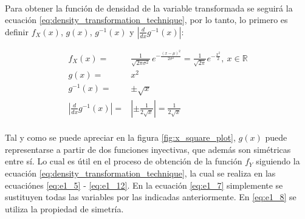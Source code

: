\documentclass{article}
\begin{document}
    \paragraph{}
    Para obtener la función de densidad de la variable transformada se seguirá la ecuación \eqref{eq:density_transformation_technique}, por lo tanto, lo primero es definir $f_X(x)$, $g(x)$, $g^{-1}(x)$ y $\left| \frac{d}{dx} g^{-1} (x) \right|$:

    \begin{align}
    \label{eq:e1_1}
      f_X(x) =& {\displaystyle {\frac {1}{\sqrt {2\pi \sigma ^{2}}}}\,e^{-{\frac {(x-\mu )^{2}}{2\sigma ^{2}}}}} = \frac{1}{\sqrt{2\pi} } e^{-\frac{x^2}{2}}, \ x \in \mathbb{R} \\
    \label{eq:e1_2}
      g(x) =& x^2 \\
    \label{eq:e1_3}
      g^{-1}(x) =& \pm \sqrt{x} \\
    \label{eq:e1_4}
      \left| \frac{d}{dx} g^{-1} (x) \right| =& \left| \pm \frac{1}{2\sqrt{x}}  \right| = \frac{1}{2\sqrt{x}}
    \end{align}

    \paragraph{}
    Tal y como se puede apreciar en la figura \ref{fig:x_square_plot}, $g(x)$ puede representarse a partir de dos funciones inyectivas, que además son simétricas entre sí. Lo cual es útil en el proceso de obtención de la función $f_Y$ siguiendo la ecuación \eqref{eq:density_transformation_technique}, la cual se realiza en las ecuaciónes \eqref{eq:e1_5} - \eqref{eq:e1_12}. En la ecuación \eqref{eq:e1_7} simplemente se sustituyen todas las variables por las indicadas anteriormente. En \eqref{eq:e1_8} se utiliza la propiedad de simetría.
\end{document}
